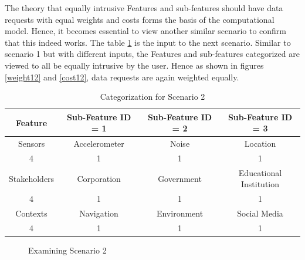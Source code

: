 The theory that equally intrusive Features and sub-features should have data requests with equal weights and costs forms the basis of the computational model. Hence, it becomes essential to view another similar scenario to confirm that this indeed works. The table \ref{tab:scenario12} is the input to the next scenario. Similar to scenario 1 but with different inputs, the Features and sub-features categorized
are viewed to all be equally intrusive by the user. Hence as shown in figures \ref{weight12} and \ref{cost12}, data requests are again weighted equally.

\begin{table}[h!]
  \centering
  \caption{Categorization for Scenario 2}
  \label{tab:scenario12}
  \begin{tabular}{cccc}
    \toprule
    Feature & Sub-Feature ID = 1 & Sub-Feature ID = 2 & Sub-Feature ID = 3\\
    \midrule
    Sensors & Accelerometer & Noise & Location\\
     4 & 1 & 1 & 1\\ \hhline{====}
     Stakeholders & Corporation & Government & Educational Institution\\
     4 & 1 & 1 & 1\\ \hhline{====}
     Contexts & Navigation & Environment & Social Media\\
     4 & 1 & 1 & 1\\ 
    \bottomrule
  \end{tabular}
\end{table}

\begin{figure}[htp]
  \caption{Examining Scenario 2}
  \label{fig:scenatio12}
\end{figure}



